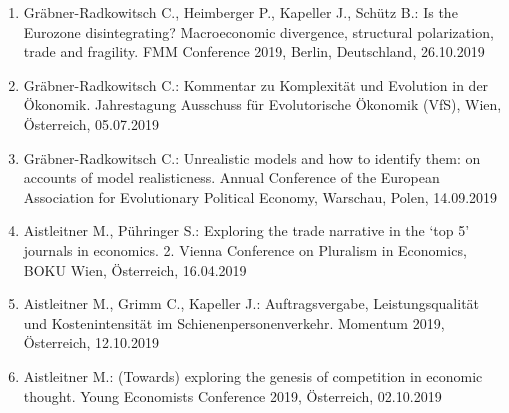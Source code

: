 \begin{enumerate}
	\item Gräbner-Radkowitsch C., Heimberger P., Kapeller J., Schütz B.: Is the Eurozone disintegrating? Macroeconomic divergence, structural polarization, trade and fragility. FMM Conference 2019, Berlin, Deutschland, 26.10.2019
	\item Gräbner-Radkowitsch C.: Kommentar zu Komplexität und Evolution in der Ökonomik. Jahrestagung Ausschuss für Evolutorische Ökonomik (VfS), Wien, Österreich, 05.07.2019
	\item Gräbner-Radkowitsch C.: Unrealistic models and how to identify them: on accounts of model realisticness. Annual Conference of the European Association for Evolutionary Political Economy, Warschau, Polen, 14.09.2019
	\item Aistleitner M., Pühringer S.: Exploring the trade narrative in the ‘top 5’ journals in economics. 2. Vienna Conference on Pluralism in Economics, BOKU Wien, Österreich, 16.04.2019
	\item Aistleitner M., Grimm C., Kapeller J.: Auftragsvergabe, Leistungsqualität und Kostenintensität im Schienenpersonenverkehr. Momentum 2019, Österreich, 12.10.2019
	\item Aistleitner M.: (Towards) exploring the genesis of competition in economic thought. Young Economists Conference 2019, Österreich, 02.10.2019
\end{enumerate}
